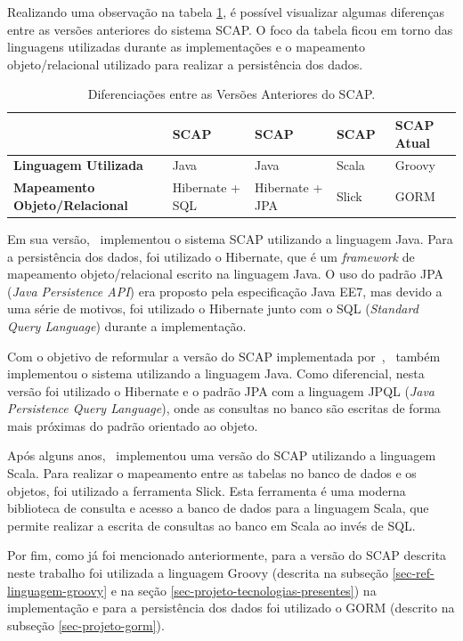Realizando uma observação na tabela \ref{tabela-diferenciacoes-versoes-anteriores-scap}, é possível visualizar algumas diferenças entre as versões anteriores do sistema SCAP. O foco da tabela ficou em torno das linguagens utilizadas durante as implementações e o mapeamento objeto/relacional utilizado para realizar a persistência dos dados.

\begin{table}[h]
	\centering	
	\vspace{0.5cm}
	\footnotesize
	\caption{Diferenciações entre as Versões Anteriores do SCAP.}	
	\label{tabela-diferenciacoes-versoes-anteriores-scap}
	\begin{tabular}{|p{2.5cm}|p{3cm}|p{3cm}|p{3cm}|p{2.5cm}|}  \hline 
 		
 		\rowcolor[rgb]{0.8,0.8,0.8} & \textbf{SCAP}~\cite{duarte-pg14} & \textbf{SCAP}~\cite{prado-pg15} & \textbf{SCAP}~\cite{guterres-pg19} & \textbf{SCAP Atual} \\\hline 
		
		\textbf{Linguagem Utilizada} & Java & Java & Scala & Groovy \\\hline
		
		\textbf{Mapeamento Objeto/Relacional} & Hibernate + SQL & Hibernate + JPA & Slick & GORM \\\hline
		
	\end{tabular}
\end{table}

Em sua versão,~ implementou o sistema SCAP utilizando a linguagem Java. Para a persistência dos dados, foi utilizado o Hibernate, que é um \textit{framework} de mapeamento objeto/relacional escrito na linguagem Java. O uso do padrão JPA (\textit{Java Persistence API}) era proposto pela especificação Java EE7, mas devido a uma série de motivos, foi utilizado o Hibernate  junto com o SQL (\textit{Standard Query Language}) durante a implementação.

Com o objetivo de reformular a versão do SCAP implementada por~,~ também implementou o sistema utilizando a linguagem Java. Como diferencial, nesta versão foi utilizado o Hibernate e o padrão JPA com a linguagem JPQL (\textit{Java Persistence Query Language}), onde as consultas no banco são escritas de forma mais próximas do padrão orientado ao objeto.

Após alguns anos,~ implementou uma versão do SCAP utilizando a linguagem Scala. Para realizar o mapeamento entre as tabelas no banco de dados e os objetos, foi utilizado a ferramenta Slick. Esta ferramenta é uma moderna biblioteca de consulta e acesso a banco de dados para a linguagem Scala, que permite realizar a escrita de consultas ao banco em Scala ao invés de SQL.

Por fim, como já foi mencionado anteriormente, para a versão do SCAP descrita neste trabalho foi utilizada a linguagem Groovy (descrita na subseção \ref{sec-ref-linguagem-groovy} e na seção \ref{sec-projeto-tecnologias-presentes}) na implementação e para a persistência dos dados foi utilizado o GORM (descrito na subseção \ref{sec-projeto-gorm}).       